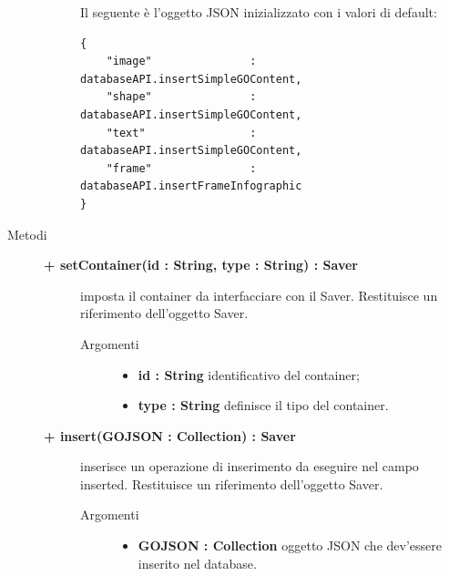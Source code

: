 \begin{description}
\begin{description}
Il seguente è l'oggetto JSON inizializzato con i valori di default:
			\begin{lstlisting}
{
    "image"               : databaseAPI.insertSimpleGOContent,
    "shape"               : databaseAPI.insertSimpleGOContent,
    "text"                : databaseAPI.insertSimpleGOContent,
    "frame"               : databaseAPI.insertFrameInfographic 
}
			\end{lstlisting}								
		
	\end{description}
	
	
\item[Metodi] \hfill

	\begin{description}
		\item[\textbf{\color{blue}+ setContainer(id : String, type : String) : Saver			}] \hfill
			imposta il container da interfacciare con il Saver. Restituisce un riferimento dell'oggetto Saver.
			
		\begin{description}
			\item[Argomenti] \hfill
				\begin{itemize}
				
					\item \textbf{id : String			} \hfill
					identificativo del container;
					\item \textbf{type : String			} \hfill
					definisce il tipo del container.
				\end{itemize}
		\end{description}
	\end{description}	

	\begin{description}
		\item[\textbf{\color{blue}+ insert(GOJSON : Collection) : Saver			}] \hfill
			inserisce un operazione di inserimento da eseguire nel campo inserted. Restituisce un riferimento dell'oggetto Saver.
			
		\begin{description}
			\item[Argomenti] \hfill
				\begin{itemize}
				
					\item \textbf{GOJSON : Collection			} \hfill
					oggetto JSON che dev'essere inserito nel database.
				\end{itemize}
		\end{description}
	\end{description}	


\end{description}
